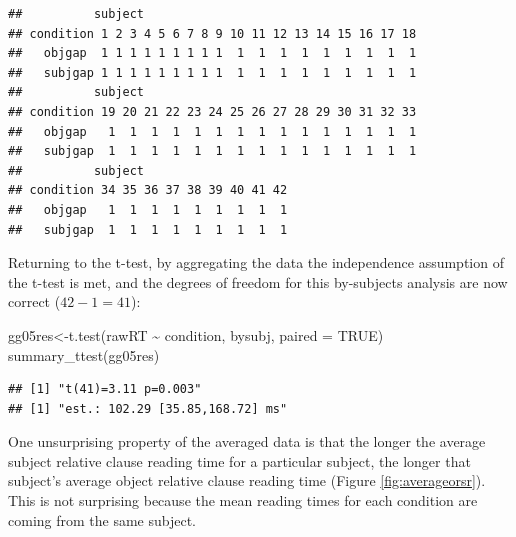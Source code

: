 \documentclass[
  12pt,
]{krantz}
\newenvironment{Shaded}{\begin{snugshade}}{\end{snugshade}}
\newcommand{\AttributeTok}[1]{\textcolor[rgb]{0.77,0.63,0.00}{#1}}
\newcommand{\ConstantTok}[1]{\textcolor[rgb]{0.00,0.00,0.00}{#1}}
\newcommand{\FunctionTok}[1]{\textcolor[rgb]{0.00,0.00,0.00}{#1}}
\newcommand{\NormalTok}[1]{#1}
\newcommand{\OtherTok}[1]{\textcolor[rgb]{0.56,0.35,0.01}{#1}}
\newcommand{\SpecialCharTok}[1]{\textcolor[rgb]{0.00,0.00,0.00}{#1}}
\newcommand{\StringTok}[1]{\textcolor[rgb]{0.31,0.60,0.02}{#1}}
\theoremstyle{definition}
\theoremstyle{definition}
\theoremstyle{definition}
\theoremstyle{definition}
\theoremstyle{remark}
\begin{document}
\begin{verbatim}
##          subject
## condition 1 2 3 4 5 6 7 8 9 10 11 12 13 14 15 16 17 18
##   objgap  1 1 1 1 1 1 1 1 1  1  1  1  1  1  1  1  1  1
##   subjgap 1 1 1 1 1 1 1 1 1  1  1  1  1  1  1  1  1  1
##          subject
## condition 19 20 21 22 23 24 25 26 27 28 29 30 31 32 33
##   objgap   1  1  1  1  1  1  1  1  1  1  1  1  1  1  1
##   subjgap  1  1  1  1  1  1  1  1  1  1  1  1  1  1  1
##          subject
## condition 34 35 36 37 38 39 40 41 42
##   objgap   1  1  1  1  1  1  1  1  1
##   subjgap  1  1  1  1  1  1  1  1  1
\end{verbatim}

Returning to the t-test, by aggregating the data the independence assumption of the t-test is met, and the degrees of freedom for this by-subjects analysis are now correct (\(42-1=41\)):

\begin{Shaded}
\begin{Highlighting}[]
\NormalTok{gg05res}\OtherTok{\textless{}{-}}\FunctionTok{t.test}\NormalTok{(rawRT }\SpecialCharTok{\textasciitilde{}}\NormalTok{ condition, bysubj, }
                \AttributeTok{paired =} \ConstantTok{TRUE}\NormalTok{)}
\FunctionTok{summary\_ttest}\NormalTok{(gg05res)}
\end{Highlighting}
\end{Shaded}

\begin{verbatim}
## [1] "t(41)=3.11 p=0.003"
## [1] "est.: 102.29 [35.85,168.72] ms"
\end{verbatim}

One unsurprising property of the averaged data is that the longer the average subject relative clause reading time for a particular subject, the longer that subject's average object relative clause reading time (Figure \ref{fig:averageorsr}). This is not surprising because the mean reading times for each condition are coming from the same subject.

\begin{Shaded}
\end{Shaded}
\end{document}
